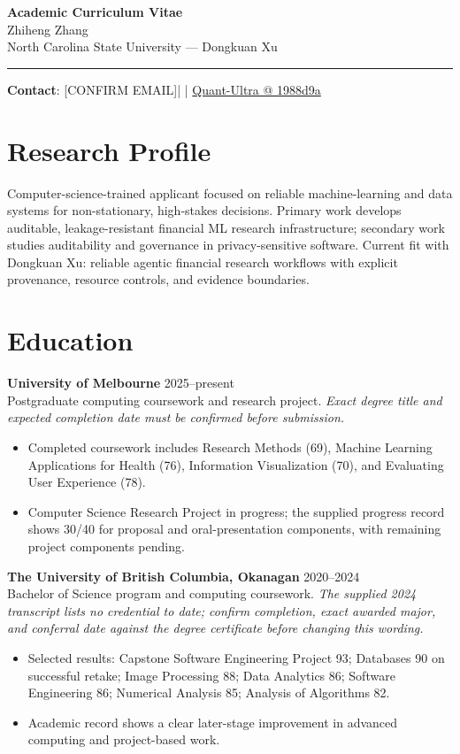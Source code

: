 \documentclass[11pt]{article}
\makeatletter
\newcommand{\ApplicantName}{Zhiheng Zhang}
\newcommand{\ApplicantEmail}{[CONFIRM EMAIL]}
\newcommand{\ApplicantPhone}{[CONFIRM PHONE]}
\newcommand{\ApplicantGitHub}{\href{https://github.com/zhiheng-zhang-Mera/Quant-Ultra/tree/1988d9a8530da91a8158de864d098ea869098923}{Quant-Ultra @ 1988d9a}}
\makeatother
\begin{document}
\begin{center}
{\LARGE\bfseries Academic Curriculum Vitae}\\[0.25em]
{\large \ApplicantName}\\
North Carolina State University --- Dongkuan Xu
\end{center}
\vspace{0.35em}\hrule\vspace{0.65em}

\textbf{Contact}: \ApplicantEmail\quad | \quad \ApplicantPhone\quad | \quad \ApplicantGitHub

\section*{Research Profile}
Computer-science-trained applicant focused on reliable machine-learning and data systems for non-stationary, high-stakes decisions. Primary work develops auditable, leakage-resistant financial ML research infrastructure; secondary work studies auditability and governance in privacy-sensitive software. Current fit with Dongkuan Xu: reliable agentic financial research workflows with explicit provenance, resource controls, and evidence boundaries.

\section*{Education}
\textbf{University of Melbourne} \hfill 2025--present\\
Postgraduate computing coursework and research project. \textit{Exact degree title and expected completion date must be confirmed before submission.}
\begin{itemize}
\item Completed coursework includes Research Methods (69), Machine Learning Applications for Health (76), Information Visualization (70), and Evaluating User Experience (78).
\item Computer Science Research Project in progress; the supplied progress record shows 30/40 for proposal and oral-presentation components, with remaining project components pending.
\end{itemize}

\textbf{The University of British Columbia, Okanagan} \hfill 2020--2024\\
Bachelor of Science program and computing coursework. \textit{The supplied 2024 transcript lists no credential to date; confirm completion, exact awarded major, and conferral date against the degree certificate before changing this wording.}
\begin{itemize}
\item Selected results: Capstone Software Engineering Project 93; Databases 90 on successful retake; Image Processing 88; Data Analytics 86; Software Engineering 86; Numerical Analysis 85; Analysis of Algorithms 82.
\item Academic record shows a clear later-stage improvement in advanced computing and project-based work.
\end{itemize}
\end{document}
